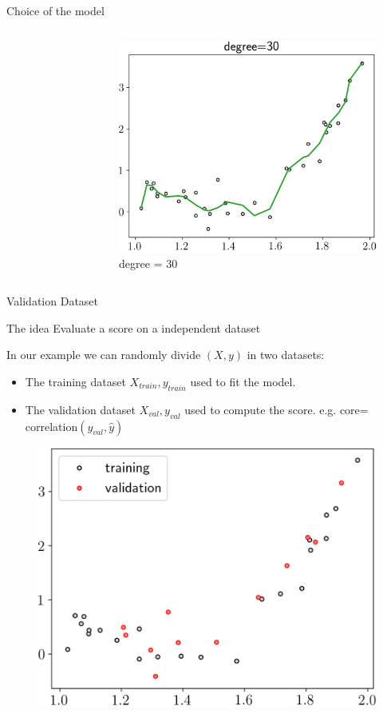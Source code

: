 \documentclass[handout]{beamer}
\begin{document}
\begin{frame}{Choice of the model}
\begin{columns}
\begin{figure}
    \end{figure}
\pause
    \begin{figure}
    \caption*{degree = 30 }
    \includegraphics[width=\textwidth]{fig/L1/interp-pol-30.png}
    \end{figure}
 
\end{columns}
   
\end{frame}


\begin{frame}{Validation Dataset}
\begin{block}{The idea}
Evaluate a score on a independent dataset
\end{block}
\pause
In our example we can randomly divide $(X,y)$ in two datasets:
\begin{itemize}
    \item The training dataset $X_{train},y_{train}$ used to fit the  model.
    \item The validation dataset $X_{val},y_{val}$ used to compute the score.
    e.g. core= correlation$(y_{val},\hat{y})$
\end{itemize}

    \begin{figure}
    \includegraphics[width=.4\textwidth]{fig/L1/datasplit.png}
    \end{figure}

\end{frame}
\end{document}

